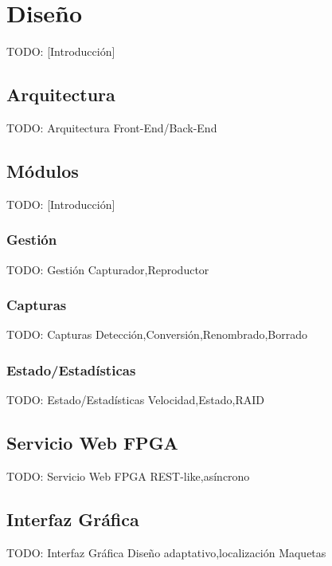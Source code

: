 \chapter{Diseño\label{cap:disenho}}

TODO: [Introducción]


\section{Arquitectura\label{sec:dis:arquitectura}}

TODO: Arquitectura
  {Front-End/Back-End}


\section{Módulos\label{sec:dis:modulos}}

TODO: [Introducción]


\subsection{Gestión\label{ssec:dis:gestion}}

TODO: Gestión
  {Capturador,Reproductor}


\subsection{Capturas\label{ssec:dis:capturas}}

TODO: Capturas
  {Detección,Conversión,Renombrado,Borrado}


\subsection{Estado/Estadísticas\label{ssec:dis:estado_estadisticas}}

TODO: Estado/Estadísticas
  {Velocidad,Estado,RAID}


\section{Servicio Web FPGA\label{sec:dis:servicio_web_fpga}}

TODO: Servicio Web FPGA
  {REST-like,asíncrono}


\section{Interfaz Gráfica\label{sec:dis:interfaz_grafica}}

TODO: Interfaz Gráfica
  {Diseño adaptativo,localización}
  {Maquetas}
  